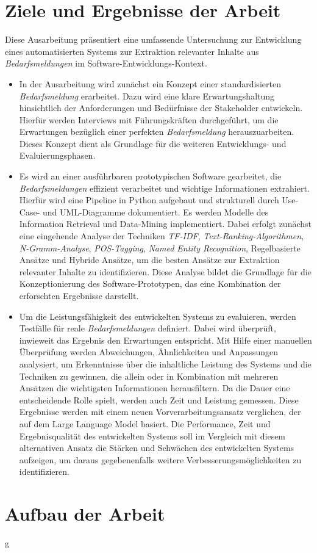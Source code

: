 \section{Ziele und Ergebnisse der Arbeit}
\label{sec:zieleundergebnis}
Diese Ausarbeitung präsentiert eine umfassende Untersuchung zur Entwicklung eines automatisierten Systems zur Extraktion relevanter Inhalte aus \emph{Bedarfsmeldungen} im Software-Entwicklungs-Kontext.
\begin{itemize}
	\item In der Ausarbeitung wird zunächst ein Konzept einer standardisierten \emph{Bedarfsmeldung} erarbeitet. Dazu wird eine klare Erwartungshaltung hinsichtlich der Anforderungen und Bedürfnisse der Stakeholder entwickeln. Hierfür werden Interviews mit Führungskräften durchgeführt, um die Erwartungen bezüglich einer \glqq{}perfekten\grqq{} \emph{Bedarfsmeldung} herauszuarbeiten. Dieses Konzept dient als Grundlage für die weiteren Entwicklungs- und Evaluierungsphasen.
	\item Es wird an einer ausführbaren prototypischen Software gearbeitet, die \emph{Bedarfsmeldungen} effizient verarbeitet und wichtige Informationen extrahiert. Hierfür wird eine Pipeline in Python aufgebaut und strukturell durch Use-Case- und UML-Diagramme dokumentiert. Es werden Modelle des Information Retrieval und Data-Mining implementiert. Dabei erfolgt zunächst eine eingehende Analyse der Techniken \emph{TF-IDF}, \emph{Text-Ranking-Algorithmen}, \emph{N-Gramm-Analyse}, \emph{POS-Tagging}, \emph{Named Entity Recognition}, Regelbasierte Ansätze und Hybride Ansätze, um die besten Ansätze zur Extraktion relevanter Inhalte zu identifizieren. Diese Analyse bildet die Grundlage für die Konzeptionierung des Software-Prototypen, das eine Kombination der erforschten Ergebnisse darstellt.
	\item Um die Leistungsfähigkeit des entwickelten Systems zu evaluieren, werden Testfälle für reale \emph{Bedarfsmeldungen} definiert. Dabei wird überprüft, inwieweit das Ergebnis den Erwartungen entspricht. Mit Hilfe einer manuellen Überprüfung werden Abweichungen, Ähnlichkeiten und Anpassungen analysiert, um Erkenntnisse über die inhaltliche Leistung des Systems und die Techniken zu gewinnen, die allein oder in Kombination mit mehreren Ansätzen die wichtigsten Informationen herausfiltern. Da die Dauer eine entscheidende Rolle spielt, werden auch Zeit und Leistung gemessen. Diese Ergebnisse werden mit einem neuen Vorverarbeitungsansatz verglichen, der auf dem Large Language Model basiert. Die Performance, Zeit und Ergebnisqualität des entwickelten Systems soll im Vergleich mit diesem alternativen Ansatz die Stärken und Schwächen des entwickelten Systems aufzeigen, um daraus gegebenenfalls weitere Verbesserungsmöglichkeiten zu identifizieren.
\end{itemize}
\section{Aufbau der Arbeit}
\newpage
g
\newpage
